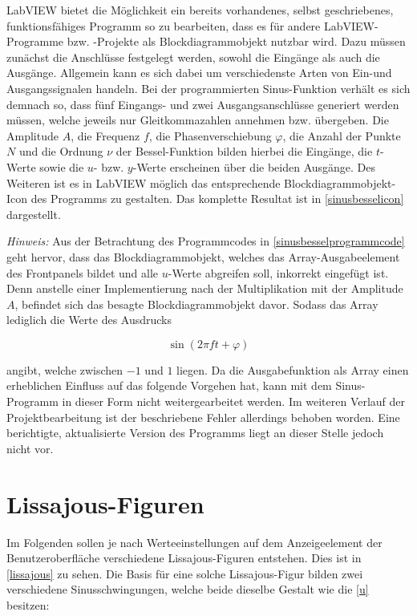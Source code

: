 \documentclass[
a4paper,
12pt,
pagesize,
ngerman
]{scrartcl}
\begin{document}
	\noindent LabVIEW bietet die Möglichkeit ein bereits vorhandenes, selbst geschriebenes, funktionsfähiges Programm so zu bearbeiten, dass es für andere LabVIEW-Programme bzw. -Projekte als Blockdiagrammobjekt nutzbar wird. Dazu müssen zunächst die Anschlüsse festgelegt werden, sowohl die Eingänge als auch die Ausgänge. Allgemein kann es sich dabei um verschiedenste Arten von Ein-und Ausgangssignalen handeln. Bei der programmierten Sinus-Funktion verhält es sich demnach so, dass fünf Eingangs- und zwei Ausgangsanschlüsse generiert werden müssen, welche jeweils nur Gleitkommazahlen annehmen bzw. übergeben. Die Amplitude $A$, die Frequenz $f$, die Phasenverschiebung $\varphi$, die Anzahl der Punkte $N$ und die Ordnung $\nu$ der Bessel-Funktion bilden hierbei die Eingänge, die $t$-Werte sowie die $u$- bzw. $y$-Werte erscheinen über die beiden Ausgänge. Des Weiteren ist es in LabVIEW möglich das entsprechende Blockdiagrammobjekt-Icon des Programms zu gestalten. Das komplette Resultat ist in \cref{sinusbesselicon} dargestellt.
	
	\emph{Hinweis:} Aus der Betrachtung des Programmcodes in \cref{sinusbesselprogrammcode} geht hervor, dass das Blockdiagrammobjekt, welches das Array-Ausgabeelement des Frontpanels bildet und alle $u$-Werte abgreifen soll, inkorrekt eingefügt ist. Denn anstelle einer Implementierung nach der Multiplikation mit der Amplitude $A$, befindet sich das besagte Blockdiagrammobjekt davor. Sodass das Array lediglich die Werte des Ausdrucks
	
	\begin{equation}
	\sin(2\pi f t + \varphi)
	\end{equation}
	
	\noindent angibt, welche zwischen $-1$ und $1$ liegen. Da die Ausgabefunktion als Array einen erheblichen Einfluss auf das folgende Vorgehen hat, kann mit dem Sinus-Programm in dieser Form nicht weitergearbeitet werden. Im weiteren Verlauf der Projektbearbeitung ist der beschriebene Fehler allerdings behoben worden. Eine berichtigte, aktualisierte Version des Programms liegt an dieser Stelle jedoch nicht vor.
	\label{sinus_amp_fehler}
	
	\section{Lissajous-Figuren}
	
	Im Folgenden sollen je nach Werteeinstellungen auf dem Anzeigeelement der Benutzeroberfläche verschiedene Lissajous-Figuren entstehen. Dies ist in \cref{lissajous} zu sehen. Die Basis für eine solche Lissajous-Figur bilden zwei verschiedene Sinusschwingungen, welche beide dieselbe Gestalt wie die \cref{u} besitzen:
	
\end{document}
